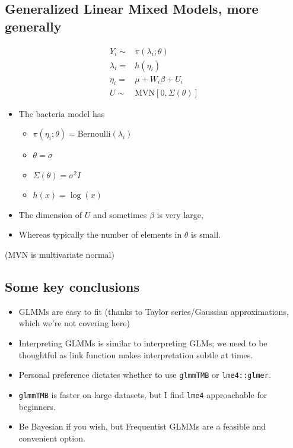 \documentclass[
  openany]{book}
\providecommand{\tightlist}{%
  \setlength{\itemsep}{0pt}\setlength{\parskip}{0pt}}
\begin{document}
\hypertarget{generalized-linear-mixed-models-more-generally}{%
\subsection{Generalized Linear Mixed Models, more generally}\label{generalized-linear-mixed-models-more-generally}}

\[
\begin{aligned}
Y_i \sim &\pi(\lambda_i; \theta)\\
\lambda_i = & h(\eta_i) \\
\eta_i = & \mu + W_i \beta + U_i\\
U \sim & \text{MVN}[0,\Sigma(\theta)]
\end{aligned}
\]

\begin{itemize}
\item
  The bacteria model has

  \begin{itemize}
  \tightlist
  \item
    \(\pi(\eta_i; \theta) = \text{Bernoulli}(\lambda_i)\)
  \item
    \(\theta = \sigma\)
  \item
    \(\Sigma(\theta) = \sigma^2 I\)
  \item
    \(h(x) = \log(x)\)
  \end{itemize}
\item
  The dimension of \(U\) and sometimes \(\beta\) is very large,
\item
  Whereas typically the number of elements in \(\theta\) is small.
\end{itemize}

(MVN is multivariate normal)

\hypertarget{some-key-conclusions}{%
\subsection{Some key conclusions}\label{some-key-conclusions}}

\begin{itemize}
\tightlist
\item
  GLMMs are easy to fit (thanks to Taylor series/Gaussian approximations, which we're not covering here)
\item
  Interpreting GLMMs is similar to interpreting GLMs; we need to be thoughtful as link function makes interpretation subtle at times.
\item
  Personal preference dictates whether to use \texttt{glmmTMB} or \texttt{lme4::glmer}.
\item
  \texttt{glmmTMB} is faster on large datasets, but I find \texttt{lme4} approachable for beginners.
\item
  Be Bayesian if you wish, but Frequentist GLMMs are a feasible and convenient option.
\end{itemize}
\end{document}
